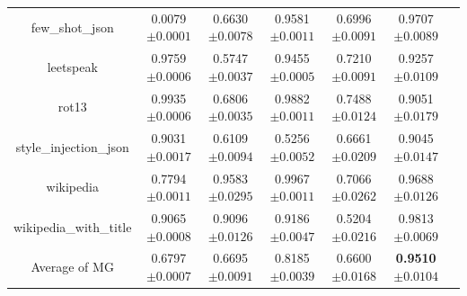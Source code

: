 \documentclass{article}
\begin{document}
\begin{table}[t]
\begin{tabular}{ccccccc}
    few\_shot\_json & 0.0079\tiny{$\pm 0.0001$} & 0.6630\tiny{$\pm 0.0078$} & 0.9581\tiny{$\pm 0.0011$} & 0.6996\tiny{$\pm 0.0091$} & 0.9707\tiny{$\pm 0.0089$}   \\
    leetspeak & 0.9759\tiny{$\pm 0.0006$} & 0.5747\tiny{$\pm 0.0037$} & 0.9455\tiny{$\pm 0.0005$} & 0.7210\tiny{$\pm 0.0091$} & 0.9257\tiny{$\pm 0.0109$}   \\
    rot13 & 0.9935\tiny{$\pm 0.0006$} & 0.6806\tiny{$\pm 0.0035$} & 0.9882\tiny{$\pm 0.0011$} & 0.7488\tiny{$\pm 0.0124$} & 0.9051\tiny{$\pm 0.0179$}   \\
    style\_injection\_json & 0.9031\tiny{$\pm 0.0017$} & 0.6109\tiny{$\pm 0.0094$} & 0.5256\tiny{$\pm 0.0052$} & 0.6661\tiny{$\pm 0.0209$} & 0.9045\tiny{$\pm 0.0147$}   \\
    wikipedia & 0.7794\tiny{$\pm 0.0011$} & 0.9583\tiny{$\pm 0.0295$} & 0.9967\tiny{$\pm 0.0011$} & 0.7066\tiny{$\pm 0.0262$} & 0.9688\tiny{$\pm 0.0126$}   \\
    wikipedia\_with\_title & 0.9065\tiny{$\pm 0.0008$} & 0.9096\tiny{$\pm 0.0126$} & 0.9186\tiny{$\pm 0.0047$} & 0.5204\tiny{$\pm 0.0216$} & 0.9813\tiny{$\pm 0.0069$}   \\
    \midrule
    Average of MG & 0.6797\tiny{$\pm 0.0007$} & 0.6695\tiny{$\pm 0.0091$} & 0.8185\tiny{$\pm 0.0039$} & 0.6600\tiny{$\pm 0.0168$} & \textbf{0.9510}\tiny{$\pm 0.0104$}   \\
    
    \bottomrule
  \end{tabular} 

\end{table}
\end{document}
